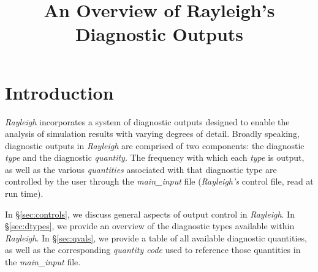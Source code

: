 \documentclass[12pt,letterpaper]{article}
\begin{document}
\title{An Overview of Rayleigh's Diagnostic Outputs}
\date{}
\maketitle
\section{Introduction}
\textit{Rayleigh} incorporates a system of diagnostic outputs designed to enable the analysis of simulation results with varying degrees of detail.  Broadly speaking, diagnostic outputs in \textit{Rayleigh} are comprised of two components:  the diagnostic \textit{type} and the diagnostic \textit{quantity}.  The frequency with which each \textit{type} is output, as well as the various \textit{quantities} associated with that diagnostic type are controlled by the user through the \textit{main\_input} file (\textit{Rayleigh's} control file, read at run time).

In \S\ref{sec:controls}, we discuss general aspects of output control in \textit{Rayleigh}. In \S\ref{sec:dtypes}, we provide an overview of the diagnostic types available within \textit{Rayleigh}.  In \S\ref{sec:qvals}, we provide a table of all available diagnostic quantities, as well as the corresponding \textit{quantity code} used to reference those quantities in the \textit{main\_input} file.
\end{document}
